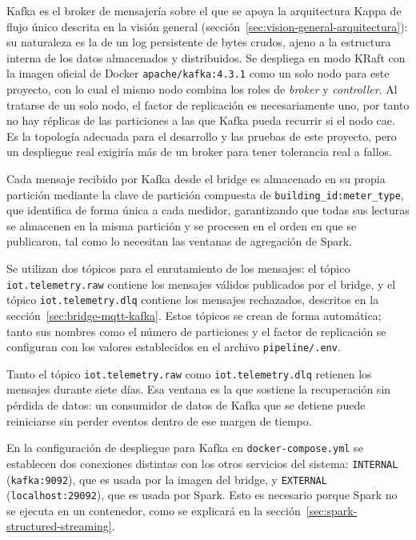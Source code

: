 Kafka es el broker de mensajería sobre el que se apoya la arquitectura Kappa de flujo único descrita en la visión general (sección~\ref{sec:vision-general-arquitectura}): su naturaleza es la de un log persistente de bytes crudos, ajeno a la estructura interna de los datos almacenados y distribuidos. Se despliega en modo KRaft con la imagen oficial de Docker \texttt{apache/kafka:4.3.1} como un solo nodo para este proyecto, con lo cual el mismo nodo combina los roles de \textit{broker} y \textit{controller}. Al tratarse de un solo nodo, el factor de replicación es necesariamente uno, por tanto no hay réplicas de las particiones a las que Kafka pueda recurrir si el nodo cae. Es la topología adecuada para el desarrollo y las pruebas de este proyecto, pero un despliegue real exigiría más de un broker para tener tolerancia real a fallos.

Cada mensaje recibido por Kafka desde el bridge es almacenado en su propia partición mediante la clave de partición compuesta de \texttt{building\_id:meter\_type}, que identifica de forma única a cada medidor, garantizando que todas sus lecturas se almacenen en la misma partición y se procesen en el orden en que se publicaron, tal como lo necesitan las ventanas de agregación de Spark.

Se utilizan dos tópicos para el enrutamiento de los mensajes: el tópico \texttt{iot.telemetry.raw} contiene los mensajes válidos publicados por el bridge, y el tópico \texttt{iot.telemetry.dlq} contiene los mensajes rechazados, descritos en la sección~\ref{sec:bridge-mqtt-kafka}. Estos tópicos se crean de forma automática; tanto sus nombres como el número de particiones y el factor de replicación se configuran con los valores establecidos en el archivo \texttt{pipeline/.env}.

Tanto el tópico \texttt{iot.telemetry.raw} como \texttt{iot.telemetry.dlq} retienen los mensajes durante siete días. Esa ventana es la que sostiene la recuperación sin pérdida de datos: un consumidor de datos de Kafka que se detiene puede reiniciarse sin perder eventos dentro de ese margen de tiempo.

En la configuración de despliegue para Kafka en \texttt{docker-compose.yml} se establecen dos conexiones distintas con los otros servicios del sistema: \texttt{INTERNAL} (\texttt{kafka:9092}), que es usada por la imagen del bridge, y \texttt{EXTERNAL} (\texttt{localhost:29092}), que es usada por Spark. Esto es necesario porque Spark no se ejecuta en un contenedor, como se explicará en la sección~\ref{sec:spark-structured-streaming}.

